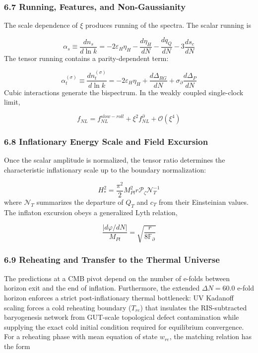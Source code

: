\documentclass[aps,prd,onecolumn,superscriptaddress,nofootinbib,longbibliography,10pt]{revtex4-2}
\begin{document}
  
\subsubsection*{6.7 Running, Features, and Non-Gaussianity}

  The scale dependence of \(\xi\) produces running of the spectra. The scalar running is


  \[ \alpha_s \equiv \frac{dn_s}{d\ln k} = -2\varepsilon_H\eta_H - \frac{d\eta_H}{dN} - \frac{dq_Q}{dN} - 3\frac{ds_c}{dN} \]
  The tensor running contains a parity-dependent term:


  \[ \alpha_t^{(\sigma)} \equiv \frac{dn_t^{(\sigma)}}{d\ln k} = -2\varepsilon_H\eta_H + \frac{d\Delta_{RG}}{dN} + \sigma_\partial \frac{d\Delta_P}{dN} \]
  Cubic interactions generate the bispectrum. In the weakly coupled single-clock limit,


  \[ f_{NL} = f_{NL}^{slow-roll} + \xi^2 f_{NL}^\partial + \mathcal{O}(\xi^4) \]

  
\subsubsection*{6.8 Inflationary Energy Scale and Field Excursion}

  Once the scalar amplitude is normalized, the tensor ratio determines the characteristic inflationary scale up to the boundary normalization:


  \[ H_*^2 = \frac{\pi^2}{2} M_{Pl}^2 r \mathcal{P}_\zeta \mathcal{N}_T^{-1} \]
  where \(\mathcal{N}_T\) summarizes the departure of \(Q_T\) and \(c_T\) from their Einsteinian values. The inflaton excursion obeys a generalized Lyth relation,


  \[ \frac{|d\varphi/dN|}{M_{Pl}} = \sqrt{\frac{r}{8\mathbb{F}_\partial}} \]

  
\subsubsection*{6.9 Reheating and Transfer to the Thermal Universe}

  The predictions at a CMB pivot depend on the number of e-folds between horizon exit and the end of inflation. Furthermore, the extended \(\Delta N = 60.0\) e-fold horizon enforces a strict post-inflationary thermal bottleneck: UV Kadanoff scaling forces a cold reheating boundary (\(T_{re}\)) that insulates the RIS-subtracted baryogenesis network from GUT-scale topological defect contamination while supplying the exact cold initial condition required for equilibrium convergence. For a reheating phase with mean equation of state \(w_{re}\), the matching relation has the form
\end{document}
